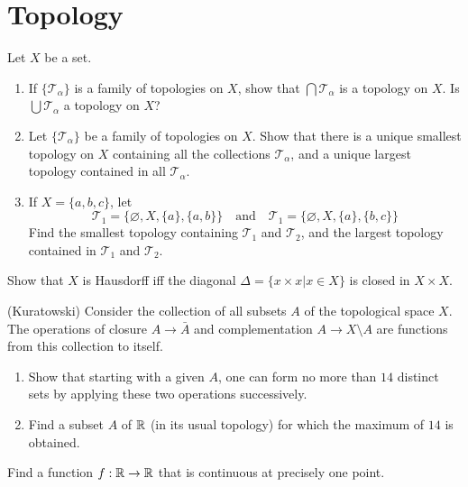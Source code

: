 \documentclass{article}
\newenvironment{problem}[2][Problem]{\begin{trivlist}
\item[\hskip \labelsep {\bfseries #1}\hskip \labelsep {\bfseries #2.}]}{\end{trivlist}}
\begin{document}
\section{Topology}
\begin{problem}{1}
Let $ X $ be a set.
\begin{enumerate}
		\item If $ \{\mathscr{T}_\alpha \} $ is a family of topologies on $ X $, show that $ \bigcap \mathscr{T}_\alpha $ is a topology on $ X $. Is $ \bigcup \mathscr{T}_\alpha $ a topology on $ X $?
		\item Let $ \{\mathscr{T}_\alpha \} $ be a family of topologies on $ X $. Show that there is a unique smallest topology on $ X $ containing all the collections $ \mathscr{T}_\alpha $, and a unique largest topology contained in all $ \mathscr{T}_\alpha $.
		\item If $ X=\{a,b,c \} $, let
		\begin{equation}
			\mathscr{T}_1 = \{\varnothing, X, \{ a\},\{a,b\} \}\quad \text{and}\quad \mathscr{T}_1 = \{\varnothing, X, \{ a\},\{b,c\} \} \nonumber
		\end{equation}
		Find the smallest topology containing $ \mathscr{T}_1 $ and $ \mathscr{T}_2 $, and the largest topology contained in $ \mathscr{T}_1 $ and $ \mathscr{T}_2 $.
\end{enumerate}
\end{problem}
\begin{problem}{2}
	Show that $ X $ is Hausdorff iff the diagonal $ \Delta = \{x \times x | x \in X \} $ is closed in $ X \times X $.
\end{problem}
\begin{problem}{3}(Kuratowski)
	Consider the collection of all subsets $ A $ of the topological space $ X $. The operations of closure $ A \to \bar{A} $ and complementation $ A \to X \setminus A $ are functions from this collection to itself.
	\begin{enumerate}
		\item Show that starting with a given $ A $, one can form no more than $ 14 $ distinct sets by applying these two operations successively.
		\item Find a subset $ A $ of $ \mathbb{R} $ (in its usual topology) for which the maximum of $ 14 $ is obtained.
	\end{enumerate}
\end{problem}
\begin{problem}{4}
	Find a function $ f:\mathbb{R} \to \mathbb{R} $ that is continuous at precisely one point.
\end{problem}
\end{document}

